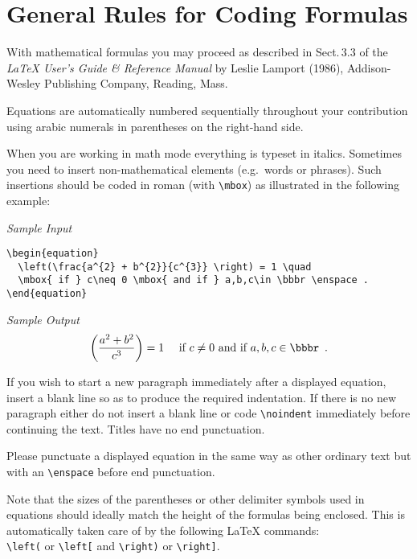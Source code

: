 \section{General Rules for Coding Formulas}
%
With mathematical formulas you may proceed as described
in Sect.\,3.3 of the {\em \LaTeX{} User's Guide \& Reference
Manual\/} by Leslie Lamport (1986), Addison-Wesley Publishing
Company, Reading, Mass.

Equations are automatically numbered sequentially throughout your
contribution using arabic numerals in parentheses on the right-hand
side.

When you are working in math mode everything is typeset in italics.
Sometimes you need to insert non-mathematical elements (e.g.\
words or phrases). Such insertions should be coded in  roman
(with \verb|\mbox|) as illustrated in the following example:
\begin{flushleft}
{\it Sample Input}
\end{flushleft}
\begin{verbatim}
\begin{equation}
  \left(\frac{a^{2} + b^{2}}{c^{3}} \right) = 1 \quad
  \mbox{ if } c\neq 0 \mbox{ and if } a,b,c\in \bbbr \enspace .
\end{equation}
\end{verbatim}
{\it Sample Output}
\begin{equation}
  \left(\frac{a^{2} + b^{2}}{c^{3}} \right) = 1 \quad
  \mbox{ if } c\neq 0 \mbox{ and if } a,b,c\in \bbbr \enspace .
\end{equation}

If you wish to start a new paragraph immediately after a displayed
equation, insert a blank line so as to produce the required
indentation. If there is no new paragraph either do not insert
a blank line or code \verb|\noindent| immediately before
continuing the text. Titles have no end punctuation.

Please punctuate a displayed equation in the same way as other
ordinary  text but with an \verb|\enspace| before end punctuation.

Note that the sizes of the parentheses or other delimiter
symbols used in equations should ideally match the height of the
formulas being enclosed. This is automatically taken care of by
the following \LaTeX{} commands:\\[2mm]
\verb|\left(| or \verb|\left[| and
\verb|\right)| or \verb|\right]|.
%
